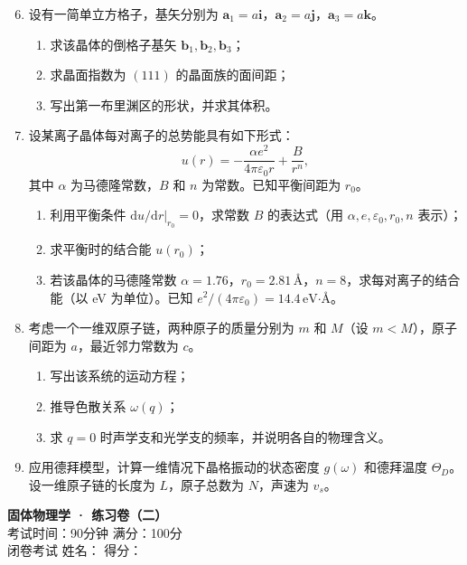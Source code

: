 \documentclass[12pt,a4paper,fontset=mac]{ctexart}
\newcommand{\dd}{\mathrm{d}}
\newcommand{\calcanswer}{\vspace{8cm}}
\begin{document}
\begin{enumerate}
\setcounter{enumi}{5}
\item 设有一简单立方格子，基矢分别为 $\mathbf{a}_1 = a\mathbf{i}$，$\mathbf{a}_2 = a\mathbf{j}$，$\mathbf{a}_3 = a\mathbf{k}$。
\begin{enumerate}
\item 求该晶体的倒格子基矢 $\mathbf{b}_1, \mathbf{b}_2, \mathbf{b}_3$；
\item 求晶面指数为 $(111)$ 的晶面族的面间距；
\item 写出第一布里渊区的形状，并求其体积。
\end{enumerate}
\calcanswer

\item 设某离子晶体每对离子的总势能具有如下形式：
\[
u(r) = -\frac{\alpha e^2}{4\pi\varepsilon_0 r} + \frac{B}{r^n},
\]
其中 $\alpha$ 为马德隆常数，$B$ 和 $n$ 为常数。已知平衡间距为 $r_0$。
\begin{enumerate}
\item 利用平衡条件 $\dd u/\dd r|_{r_0}=0$，求常数 $B$ 的表达式（用 $\alpha, e, \varepsilon_0, r_0, n$ 表示）；
\item 求平衡时的结合能 $u(r_0)$；
\item 若该晶体的马德隆常数 $\alpha = 1.76$，$r_0 = 2.81\,\text{Å}$，$n = 8$，求每对离子的结合能（以 eV 为单位）。已知 $e^2/(4\pi\varepsilon_0) = 14.4\,\text{eV·Å}$。
\end{enumerate}
\calcanswer

\newpage

\item 考虑一个一维双原子链，两种原子的质量分别为 $m$ 和 $M$（设 $m < M$），原子间距为 $a$，最近邻力常数为 $c$。
\begin{enumerate}
\item 写出该系统的运动方程；
\item 推导色散关系 $\omega(q)$；
\item 求 $q = 0$ 时声学支和光学支的频率，并说明各自的物理含义。
\end{enumerate}
\calcanswer

\item 应用德拜模型，计算一维情况下晶格振动的状态密度 $g(\omega)$ 和德拜温度 $\Theta_D$。设一维原子链的长度为 $L$，原子总数为 $N$，声速为 $v_s$。
\calcanswer

\end{enumerate}

\newpage

\begin{center}
{\LARGE \textbf{固体物理学 · 练习卷（二）}}\\[0.5em]
{\large 考试时间：90分钟 \quad 满分：100分}\\[0.3em]
{\normalsize 闭卷考试 \quad 姓名：\underline{\hspace{3cm}} \quad 得分：\underline{\hspace{2cm}}}
\end{center}
\end{document}

